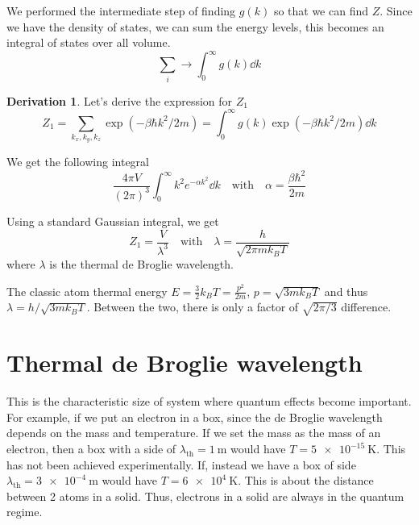 \documentclass[12pt,chapterprefix=false,dvipsnames]{scrbook}
\theoremstyle{dotless}
\theoremstyle{definition}
\newtheorem{protoderivation}{Derivation}[section]
\newenvironment{derivation}
{\colorlet{shadecolor}{purple!15}\begin{shaded}\begin{protoderivation}}
			{\end{protoderivation}\end{shaded}}
\begin{document}
We performed the intermediate step of finding
$g\left(k\right)$ so that we can find
$Z$. Since we have the density of states, we
can sum the energy levels, this becomes an integral of states
over all volume.
\begin{equation}
	\sum_i \rightarrow \int^\infty_0 g\left(k\right)
	\dd{k}
\end{equation}

\begin{derivation}
	Let's derive the expression for $Z_1$
	\begin{equation}
		Z_1 = \sum_{k_x,k_y,k_z} \exp\left(-\beta \hbar k^2 / 2m\right) =
		\int_0^\infty g\left(k\right)
		\exp\left(-\beta \hbar k^2 / 2m\right) \dd{k}
	\end{equation}

	We get the following integral
	\begin{equation}
		\frac{4\pi V}{{\left(2\pi\right)}^3} \int_0^\infty k^2
		e^{-\alpha k^2} \dd{k}
		\hspace{1em} \mathrm{with}
		\hspace{1em} \alpha = \frac{\beta \hbar^2}{2m}
	\end{equation}

	Using a standard Gaussian integral, we get
	\begin{equation}
		\label{eq:partition_function}
		Z_1 = \frac{V}{\lambda^3} \hspace{1em}
		\mathrm{with} \hspace{1em} \lambda =
		\frac{h}{\sqrt{2\pi m k_B T}}
	\end{equation}
	where $\lambda$ is the thermal de Broglie
	wavelength.

	The classic atom thermal energy $E = \frac{3}{2}k_B	T = \frac{p^2}{2m}$,
	$ p = \sqrt{3 m k_B T} $ and thus $ \lambda = h / \sqrt{3m k_B T} $.
	Between the two, there is only a factor of
	$\sqrt{2\pi/3}$ difference.
\end{derivation}

\section{Thermal de Broglie wavelength}%
\label{sec:thermal_de_broglie_wavelength}

This is the characteristic size of system where quantum effects
become important. For example, if we put an electron in a box,
since the de Broglie wavelength depends on the mass and
temperature. If we set the mass as the mass of an electron, then
a box with a side of $\lambda_{\mathrm{th}} =
	\SI{1}{\metre}$ would have
$T = \SI{ 5e-15 }{\kelvin}$. This has not been achieved
experimentally. If, instead we have a box of side
$\lambda_{\mathrm{th}} =
	\SI{3e-4}{\metre}$ would have $T = \SI{ 6e4 }{\kelvin}$. This
is about the distance between 2 atoms in a solid. Thus,
electrons in a solid are always in the quantum regime.
\end{document}
